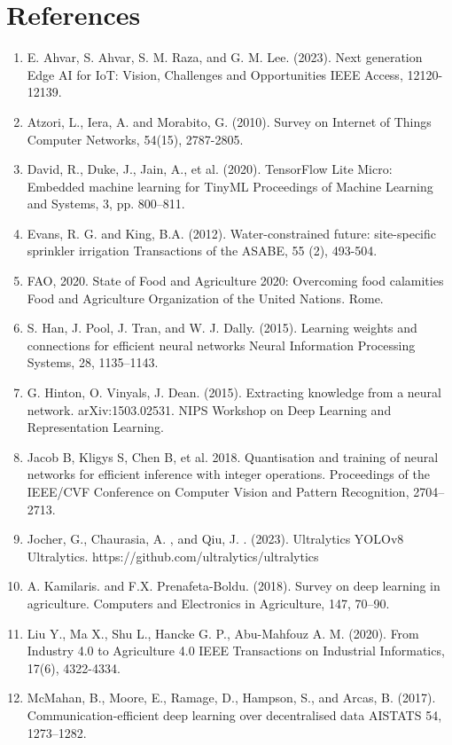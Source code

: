 \documentclass[12pt,a4paper]{report}
\begin{document}
\chapter*{References}
\begin{enumerate}
    \item E. Ahvar, S. Ahvar, S. M. Raza, and G. M. Lee. (2023). Next generation Edge AI for IoT: Vision, Challenges and Opportunities IEEE Access, 12120-12139.
    \item Atzori, L., Iera, A. and Morabito, G. (2010). Survey on Internet of Things Computer Networks, 54(15), 2787-2805.
    \item David, R., Duke, J., Jain, A., et al. (2020). TensorFlow Lite Micro: Embedded machine learning for TinyML Proceedings of Machine Learning and Systems, 3, pp. 800--811.
    \item Evans, R. G. and King, B.A. (2012). Water-constrained future: site-specific sprinkler irrigation Transactions of the ASABE, 55 (2), 493-504.
    \item FAO, 2020. State of Food and Agriculture 2020: Overcoming food calamities Food and Agriculture Organization of the United Nations. Rome.
    \item S. Han, J. Pool, J. Tran, and W. J. Dally. (2015). Learning weights and connections for efficient neural networks Neural Information Processing Systems, 28, 1135--1143.
    \item G. Hinton, O. Vinyals, J. Dean. (2015). Extracting knowledge from a neural network. arXiv:1503.02531. NIPS Workshop on Deep Learning and Representation Learning.
    \item Jacob B, Kligys S, Chen B, et al. 2018. Quantisation and training of neural networks for efficient inference with integer operations. Proceedings of the IEEE/CVF Conference on Computer Vision and Pattern Recognition, 2704--2713.
    \item Jocher, G., Chaurasia, A. , and Qiu, J. . (2023). Ultralytics YOLOv8 Ultralytics. https://github.com/ultralytics/ultralytics
    \item A. Kamilaris. and F.X. Prenafeta-Boldu. (2018). Survey on deep learning in agriculture. Computers and Electronics in Agriculture, 147, 70--90.
    \item Liu Y., Ma X., Shu L., Hancke G. P., Abu-Mahfouz A. M. (2020). From Industry 4.0 to Agriculture 4.0 IEEE Transactions on Industrial Informatics, 17(6), 4322-4334.
    \item McMahan, B., Moore, E., Ramage, D., Hampson, S., and Arcas, B. (2017). Communication-efficient deep learning over decentralised data AISTATS 54, 1273--1282.

\end{enumerate}
\end{document}
